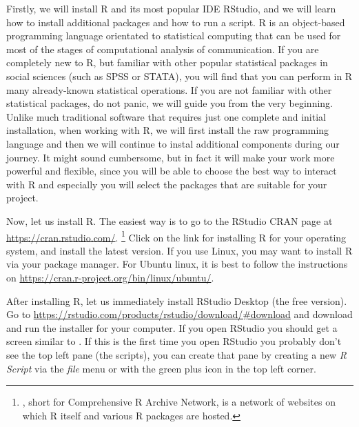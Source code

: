 Firstly, we will install R and its most popular IDE RStudio, and we
will learn how to install additional packages and how to run a
script. R is an object-based programming language
orientated to statistical computing that can be used for most of the
stages of computational analysis of communication.  If you are
completely new to R, but familiar with other popular
statistical packages in social sciences (such as SPSS or STATA), you
will find that you can perform in R many already-known statistical
operations. If you are not familiar with other statistical packages,
do not panic, we will guide you from the very beginning. Unlike
much traditional software that requires just one complete and initial
installation, when working with R, we will first install the raw
programming language and then we will continue to instal additional
components during  our journey. It might sound cumbersome, but
in fact it will make your work more powerful and flexible, since you
will be able to choose the best way to interact with R and especially
you will select the packages that are suitable for your project.

Now, let us install R.
The easiest way is to go to the RStudio CRAN page at \url{https://cran.rstudio.com/}.
\footnote{, short for Comprehensive R Archive Network, is a network
  of websites on which R itself and various R packages are hosted.}
Click on the link for installing R for your operating system, and
install the latest version.
If you use Linux, you may want to install R via your package manager.
For Ubuntu linux, it is best to follow the instructions on \url{https://cran.r-project.org/bin/linux/ubuntu/}.


After installing R, let us immediately install RStudio Desktop (the free version).
Go to \url{https://rstudio.com/products/rstudio/download/#download} and download and run the installer for your computer.
If you open RStudio you should get a screen similar to .
If this is the first time you open RStudio you probably don't see the top left pane (the scripts),
you can create that pane by creating a new \emph{R Script} via the \emph{file} menu or with the green plus icon in the top left corner. 

